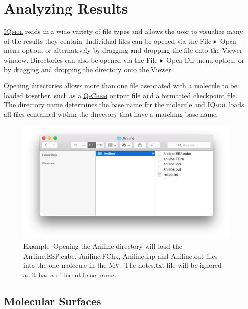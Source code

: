 \documentclass[a4paper,12pt]{article}
\newcommand{\qchem}{\href{https://q-chem.com}{{\scshape Q-Chem}}}
\newcommand{\iqmol}{\href{https://www.iqmol.org}{{\scshape IQmol}}}
\newcommand{\bt}{\ensuremath{\blacktriangleright}}
\begin{document}


\newpage
\section{Analyzing Results}
\label{sec:anal}

\iqmol{} reads in a wide variety of file types and allows the user to visualize
many of the results they contain.  Individual files can be opened via the File
\bt\ Open menu option, or alternatively by dragging and dropping the file onto
the Viewer window.  Directories can also be opened via the File \bt\ Open Dir
menu option, or by dragging and dropping the directory onto the Viewer.  

Opening directories allows more than one file associated with a molecule to be
loaded together, such as a \qchem{} output file and a formatted checkpoint
file.  The directory name determines the base name for the molecule and
\iqmol{} loads all files contained within the directory that have a matching
base name.  
\begin{figure}[h]
\begin{center}
\includegraphics[scale=0.40]{figures/OpenDir.png}
\caption{Example: Opening the Aniline directory will load the Aniline.ESP.cube,
Aniline.FChk, Aniline.inp and Aniline.out files into the one molecule in the
MV.  The notes.txt file will be ignored as it has a different base name.} 
\end{center}
\end{figure}


\subsection{Molecular Surfaces}
\end{document}
